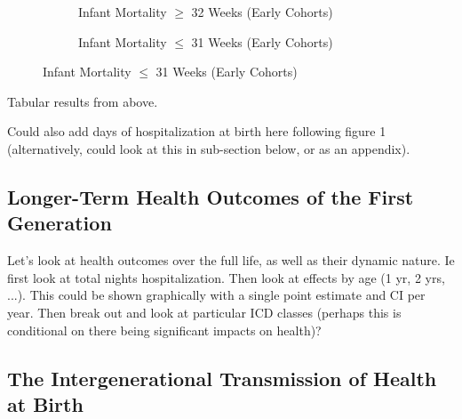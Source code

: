 \documentclass[11pt]{article}
\begin{document}
\begin{spacing}{1.5}
\begin{figure}[htpb!]
    \begin{subfigure}{.45\textwidth}
      \centering
      \caption{Infant Mortality $\geq$ 32 Weeks (Early Cohorts)}
      \label{fig:IMROPT32}
    \end{subfigure}
    \begin{subfigure}{.45\textwidth}
      \centering
      \caption{Infant Mortality $\leq$ 31 Weeks (Early Cohorts)}
      \label{fig:IMROPT31}
    \end{subfigure}
  \end{figure}


  Tabular results from above.
  

  Could also add days of hospitalization at birth here following figure 1 (alternatively, could look at this in sub-section below, or as an appendix).
  
  \subsection{Longer-Term Health Outcomes of the First Generation}
  Let's look at health outcomes over the full life, as well as their dynamic nature.  Ie first look at total nights hospitalization.  Then look at effects by age (1 yr, 2 yrs, ...). This could be shown graphically with a single point estimate and CI per year.  Then break out and look at particular ICD classes (perhaps this is conditional on there being significant impacts on health)?
  
  
  \subsection{The Intergenerational Transmission of Health at Birth}


\end{spacing}
\end{document}
